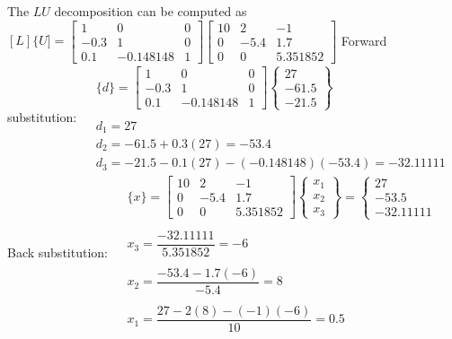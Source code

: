 \documentclass[../main.tex]{subfiles}
\begin{document}
\section{}
The $L U$ decomposition can be computed as
\bigbreak
$[L]\{U]=\left[\begin{array}{ccc}
1 & 0 & 0 \\
-0.3 & 1 & 0 \\
0.1 & -0.148148 & 1
\end{array}\right]\left[\begin{array}{ccc}
10 & 2 & -1 \\
0 & -5.4 & 1.7 \\
0 & 0 & 5.351852
\end{array}\right]$
\bigbreak
Forward substitution:
\bigbreak$
\begin{aligned}
&\{d\}=\left[\begin{array}{ccc}
1 & 0 & 0 \\
-0.3 & 1 & 0 \\
0.1 & -0.148148 & 1
\end{array}\right]\left\{\begin{array}{c}
27 \\
-61.5 \\
-21.5
\end{array}\right\} \\\\
&d_{1}=27 \\
&d_{2}=-61.5+0.3(27)=-53.4 \\
&d_{3}=-21.5-0.1(27)-(-0.148148)(-53.4)=-32.11111
\end{aligned}$
\bigbreak
Back substitution:
\bigbreak$
\begin{aligned}
&\{x\}=\left[\begin{array}{ccc}
10 & 2 & -1 \\
0 & -5.4 & 1.7 \\
0 & 0 & 5.351852
\end{array}\right]\left\{\begin{array}{l}
x_{1} \\
x_{2} \\
x_{3}
\end{array}\right\}=\left\{\begin{array}{c}
27 \\
-53.5 \\
-32.11111
\end{array}\right. \\\\
&x_{3}=\dfrac{-32.11111}{5.351852}=-6 \\\\
&x_{2}=\dfrac{-53.4-1.7(-6)}{-5.4}=8 \\\\
&x_{1}=\dfrac{27-2(8)-(-1)(-6)}{10}=0.5
\end{aligned}$
\end{document}

